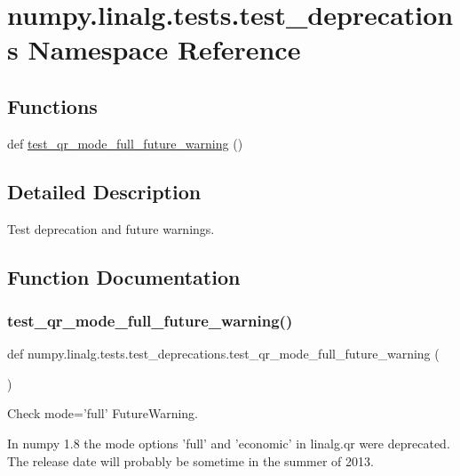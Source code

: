 \hypertarget{namespacenumpy_1_1linalg_1_1tests_1_1test__deprecations}{}\section{numpy.\+linalg.\+tests.\+test\+\_\+deprecations Namespace Reference}
\label{namespacenumpy_1_1linalg_1_1tests_1_1test__deprecations}
\subsection*{Functions}
\begin{DoxyCompactItemize}
\item 
def \hyperlink{namespacenumpy_1_1linalg_1_1tests_1_1test__deprecations_a0afbbff0c1994a3cc869b342f4891a83}{test\+\_\+qr\+\_\+mode\+\_\+full\+\_\+future\+\_\+warning} ()
\end{DoxyCompactItemize}


\subsection{Detailed Description}
\begin{DoxyVerb}Test deprecation and future warnings.\end{DoxyVerb}
 

\subsection{Function Documentation}
\mbox{\label{namespacenumpy_1_1linalg_1_1tests_1_1test__deprecations_a0afbbff0c1994a3cc869b342f4891a83}} 
\subsubsection{\texorpdfstring{test\+\_\+qr\+\_\+mode\+\_\+full\+\_\+future\+\_\+warning()}{test\_qr\_mode\_full\_future\_warning()}}
{\footnotesize\ttfamily def numpy.\+linalg.\+tests.\+test\+\_\+deprecations.\+test\+\_\+qr\+\_\+mode\+\_\+full\+\_\+future\+\_\+warning (\begin{DoxyParamCaption}{ }\end{DoxyParamCaption})}

\begin{DoxyVerb}Check mode='full' FutureWarning.

In numpy 1.8 the mode options 'full' and 'economic' in linalg.qr were
deprecated. The release date will probably be sometime in the summer
of 2013.\end{DoxyVerb}
 